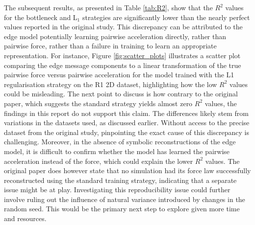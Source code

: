 \documentclass[11pt]{article}
\begin{document}
The subsequent results, as presented in Table \ref{tab:R2}, show that the $R^2$ values for the bottleneck and L$_1$ strategies are significantly lower than the nearly perfect values reported in the original study. This discrepancy can be attributed to the edge model potentially learning pairwise acceleration directly, rather than pairwise force, rather than a failure in training to learn an appropriate representation. For instance, Figure \ref{fig:scatter_plots} illustrates a scatter plot comparing the edge message components to a linear transformation of the true pairwise force versus pairwise acceleration for the model trained with the L1 regularisation strategy on the R1 2D dataset, highlighting how the low $R^2$ values could be misleading. The next point to discuss is how contrary to the original paper, which suggests the standard strategy yields almost zero $R^2$ values, the findings in this report do not support this claim. The differences likely stem from variations in the datasets used, as discussed earlier. Without access to the precise dataset from the original study, pinpointing the exact cause of this discrepancy is challenging. Moreover, in the absence of symbolic reconstructions of the edge model, it is difficult to confirm whether the model has learned the pairwise acceleration instead of the force, which could explain the lower $R^2$ values. The original paper does however state that no simulation had its force law successfully reconstructed using the standard training strategy, indicating that a separate issue might be at play. Investigating this reproducibility issue could further involve ruling out the influence of natural variance introduced by changes in the random seed. This would be the primary next step to explore given more time and resources.
\end{document}
